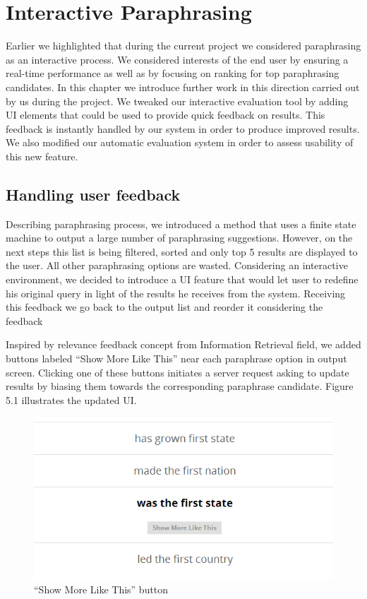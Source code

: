 
\chapter{Interactive Paraphrasing}

Earlier we highlighted that during the current project we considered paraphrasing as an interactive process. We considered interests of the end user by ensuring a real-time performance as well as by focusing on ranking for top paraphrasing candidates. In this chapter we introduce further work in this direction carried out by us during the project. We tweaked our interactive evaluation tool by adding UI elements that could be used to provide quick feedback on results. This feedback is instantly handled by our system in order to produce improved results. We also modified our automatic evaluation system in order to assess usability of this new feature.

\section{Handling user feedback}

Describing paraphrasing process, we introduced a method that uses a finite state machine to output a large number of paraphrasing suggestions. However, on the next steps this list is being filtered, sorted and only top 5 results are displayed to the user. All other paraphrasing options are wasted. Considering an interactive environment, we decided to introduce a UI feature that would let user to redefine his original query in light of the results he receives from the system. Receiving this feedback we go back to the output list and reorder it considering the feedback 

Inspired by relevance feedback concept from Information Retrieval field, we added buttons labeled ``Show More Like This'' near each paraphrase option in output screen. Clicking one of these buttons initiates a server request asking to update results by biasing them towards the corresponding paraphrase candidate. Figure 5.1 illustrates the updated UI. 

\begin{figure}
 \centering 
 \includegraphics[scale=0.8]{g/show-more-like-this.png}
 \caption{``Show More Like This'' button}
\end{figure}

